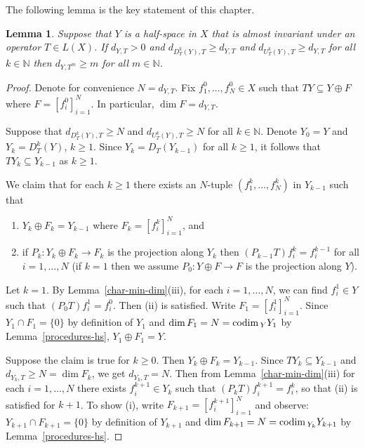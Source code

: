 \documentclass[12pt]{amsart}
\theoremstyle{plain}
\newtheorem{lemma}[theorem]{Lemma}
\theoremstyle{definition}
\theoremstyle{remark}
\begin{document}
The following lemma is the key statement of this chapter.

\begin{lemma}\label{key-lemma}
Suppose that $Y$ is a half-space in $X$ that is almost invariant under an operator $T\in L(X)$. If $d_{Y,T}>0$ and $d_{D^k_T(Y),T}{\geqslant} d_{Y,T}$ and $d_{U^k_T(Y),T}{\geqslant} d_{Y,T}$ for all $k\in\mathbb N$ then $d_{Y,T^m}{\geqslant} m$ for all $m\in\mathbb N$.
\end{lemma}

\begin{proof}
 
Denote for convenience $N=d_{Y,T}$. Fix $f_1^{0},\dots,f_N^{0}\in X$ such that $TY\subseteq Y\oplus F$ where $F=[f_i^{0}]_{i=1}^N$. In particular, $\dim F=d_{Y,T}$.
 
Suppose that $d_{D_T^k(Y),T}{\geqslant} N$ and $d_{U_T^k(Y),T}{\geqslant} N$ for all $k\in\mathbb N$. Denote $Y_0=Y$ and $Y_k=D^k_T(Y)$, $k{\geqslant} 1$. Since $Y_k=D_T(Y_{k-1})$ for all $k{\geqslant} 1$, it follows that $TY_k\subseteq Y_{k-1}$ as $k{\geqslant} 1$. 
 
We claim that for each $k{\geqslant} 1$ there exists an $N$-tuple $(f_1^{k},\dots,f_N^{k})$ in $Y_{k-1}$ such that 
\begin{enumerate}
\item $Y_k\oplus F_k=Y_{k-1}$ where $F_k=[f_i^{k}]_{i=1}^N$, and
\item if $P_k:Y_k\oplus F_k\to F_k$ is the projection along $Y_k$ then $(P_{k-1}T)f_i^{k}=f_i^{k-1}$ for all $i=1,\dots,N$ (if $k=1$ then we assume $P_0:Y\oplus F\to F$ is the projection along $Y$).
\end{enumerate}

Let $k=1$. By Lemma~\ref{char-min-dim}(iii), for each $i=1,\dots,N$, we can find $f_i^{1}\in Y$ such that $(P_0T)f_i^{1}=f_i^{0}$. Then (ii) is satisfied. Write $F_1=[f_i^{1}]_{i=1}^N$. Since $Y_1\cap F_1=\{0\}$ by definition of $Y_1$ and $\dim F_1=N={{\rm codim}\,}_YY_1$ by Lemma~\ref{procedures-hs}, $Y_1\oplus F_1=Y$.

Suppose the claim is true for $k{\geqslant} 0$. Then $Y_k\oplus F_k=Y_{k-1}$. Since $TY_k\subseteq Y_{k-1}$ and $d_{Y_k,T}{\geqslant} N=\dim F_k$, we get $d_{Y_k,T}=N$. Then from Lemma~\ref{char-min-dim}(iii) for each $i=1,\dots,N$ there exists $f_i^{k+1}\in Y_k$ such that $(P_{k}T)f_i^{k+1}=f_i^{k}$, so that (ii) is satisfied for $k+1$. To show (i), write $F_{k+1}=[f_i^{k+1}]_{i=1}^N$ and observe: $Y_{k+1}\cap F_{k+1}=\{0\}$ by definition of $Y_{k+1}$ and $\dim F_{k+1}=N={{\rm codim}\,}_{Y_k}Y_{k+1}$ by Lemma~\ref{procedures-hs}.


\end{proof}
\end{document}
